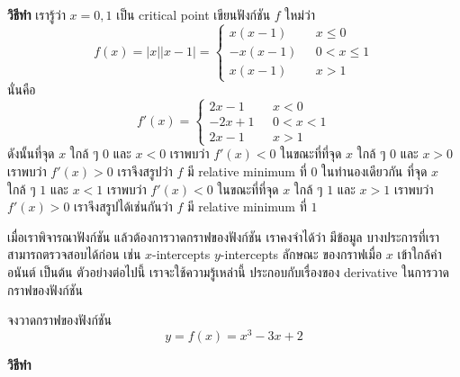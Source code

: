 \documentclass[
]{book}
\begin{document}
\textbf{วิธีทำ} เรารู้ว่า \(x=0,1\) เป็น critical point เขียนฟังก์ชัน \(f\) ใหม่ว่า
\[f(x) = |x||x-1| = \begin{cases}
    x(x-1) & \text{ $x \le 0$}  \\
    -x(x-1) & \text{ $0< x \le 1$} \\
    x(x-1) & \text{ $x > 1$}
    \end{cases}\] นั่นคือ \[f'(x) = \begin{cases}
    2x-1 & \text{ $x < 0$} \\
    -2x+1 & \text{ $0 < x < 1$} \\
    2x-1 & \text{ $x> 1$}
    \end{cases}\] ดังนั้นที่จุด \(x\) ใกล้ ๆ \(0\) และ \(x<0\) เราพบว่า
\(f'(x) < 0\) ในขณะที่ที่จุด \(x\) ใกล้ ๆ \(0\) และ \(x>0\) เราพบว่า
\(f'(x) > 0\) เราจึงสรูปว่า \(f\) มี relative minimum ที่ \(0\) ในทำนองเดียวกัน
ที่จุด \(x\) ใกล้ ๆ \(1\) และ \(x<1\) เราพบว่า \(f'(x) < 0\) ในขณะที่ที่จุด \(x\)
ใกล้ ๆ \(1\) และ \(x>1\) เราพบว่า \(f'(x) > 0\) เราจึงสรูปได้เช่นกันว่า \(f\) มี
relative minimum ที่ \(1\)

เมื่อเราพิจารณาฟังก์ชัน แล้วต้องการวาดกราฟของฟังก์ชัน เราคงจำได้ว่า มีข้อมูล
บางประการที่เราสามารถตรวจสอบได้ก่อน เช่น \(x\)-intercepts \(y\)-intercepts
ลักษณะ ของกราฟเมื่อ \(x\) เข้าใกล้ค่าอนันต์ เป็นต้น ตัวอย่างต่อไปนี้ เราจะใช้ความรู้เหล่านี้
ประกอบกับเรื่องของ derivative ในการวาดกราฟของฟังก์ชัน

จงวาดกราฟของฟังก์ชัน \[y = f(x) =  x^3-3x+2\]

\textbf{วิธีทำ}
\end{document}
